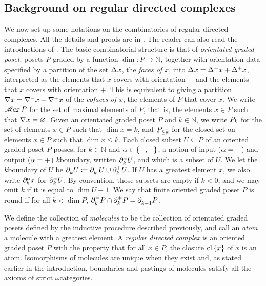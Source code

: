 \subsection*{Background on regular directed complexes}

We now set up some notations on the combinatorics of regular directed complexes.
All the details and proofs are in \cite{hadzihasanovic2024combinatorics}.
The reader can also read the introductions of \cite{chanavat2024htpy, chanavat2024equivalences, chanavat2024model}.
The basic combinatorial structure is that of \emph{orientated graded poset}: posets \( P \) graded by a function \( \dim \colon P \to \mathbb{N} \), together with orientation data specified by a partition of the set \( \faces{}{} x \), the \emph{faces of \( x \)}, into \( \faces{}{} x = \faces{}{-} x + \faces{}{+} x \), interpreted as the elements that \( x \) covers with orientation \( - \) and the elements that \( x \) covers with orientation \( + \). 
This is equivalent to giving a partition \( \cofaces{}{} x = \cofaces{}{-} x + \cofaces{}{+} x \) of the \emph{cofaces of \( x \)}, the elements of \( P \) that cover \( x \).
We write \( \maxel{P} \) for the set of maximal elements of \( P \), that is, the elements \( x \in P \) such that \( \cofaces{}{} x = \varnothing \).
Given an orientated graded poset \( P \) and \( k \in \mathbb{N} \), we write \( \gr{k}{P} \) for the set of elements \( x \in P \) such that \( \dim x = k \), and \( \gr{\le k}{P} \) for the closed set on elements \( x \in P \) such that \( \dim x \le k \). 
Each closed subset \( U \subseteq P \) of an oriented graded poset \( P \) posses, for \( k \in \mathbb{N} \) and \( \a \in \set{-, +} \), a notion of input (\( \a = - \)) and output (\( \a = + \)) \( k \)\nbd boundary, written \( \bd{k}{\a} U \), and which is a subset of \( U \). 
We let the \( k \)\nbd boundary of \( U \) be \( \bd{k}{} U \eqdef \bd{k}{-} U \cup \bd{k}{+} U \).
If \( U \) has a greatest element \( x \), we also write \( \bd{k}{\a} x \) for \( \bd{k}{\a} U \).
By convention, those subsets are empty if \( k < 0 \), and we may omit \( k \) if it is equal to \( \dim U - 1 \).
We say that finite oriented graded poset \( P \) is round if for all \( k < \dim P  \), \( \bd{k}{-} P \cap \bd{k}{+} P = \bd{k - 1}{} P \).

We define the collection of \emph{molecules} to be the collection of orientated graded posets defined by the inductive procedure described previously, and call an \emph{atom} a molecule with a greatest element.
A \emph{regular directed complex} is an oriented graded poset \( P \) with the property that for all \( x \in P \), the closure \( \clset{x} \) of \( x \) is an atom.
Isomorphisms of molecules are unique when they exist and, as stated earlier in the introduction, boundaries and pastings of molecules satisfy all the axioms of strict \( \omega \)\nbd categories.

